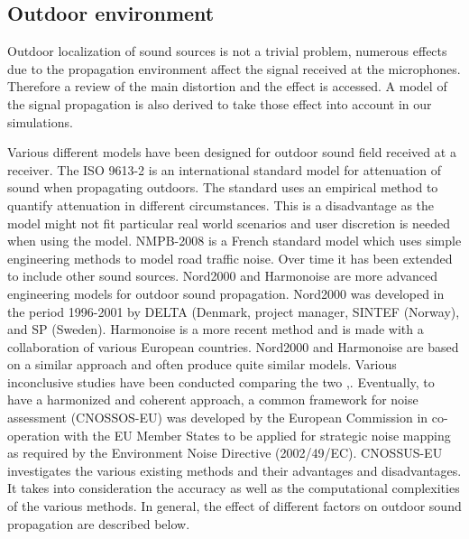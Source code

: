 \subsection{Outdoor environment}

Outdoor localization of sound sources is not a trivial problem, numerous effects due to the propagation environment affect the signal received at the microphones. Therefore a review of the main distortion and the effect is accessed. A model of the signal propagation is also derived to take those effect into account in our simulations. 

Various different models have been designed for outdoor sound field received at a receiver. The ISO 9613-2 \cite{ISO9613} is an international standard model for attenuation of sound when propagating outdoors. The standard uses an empirical method to quantify attenuation in different circumstances. This is a disadvantage as the model might not fit particular real world scenarios and user discretion is needed when using the model. NMPB-2008 \cite{dutilleux2010nmpb} is a French standard model which uses simple engineering methods to model road traffic noise. Over time it has been extended to include other sound sources. Nord2000 \cite{plovsing2000nord2000} and Harmonoise \cite{defrance2007outdoor} are more advanced engineering models for outdoor sound propagation. Nord2000 was developed in the period 1996-2001 by DELTA (Denmark, project manager, SINTEF (Norway), and SP (Sweden). Harmonoise is a more recent method and is made with a collaboration of various European countries. Nord2000 and Harmonoise are based on a similar approach and often produce quite similar models. Various inconclusive studies have been conducted comparing the two \cite{garg2014critical},\cite{jonsson2008comparison}. Eventually, to have a harmonized and coherent approach, a common framework for noise assessment (CNOSSOS-EU) was developed by the European Commission \cite{kephalopoulos2012common} in co-operation with the EU Member States to be applied for strategic noise mapping as required by the Environment Noise Directive (2002/49/EC). CNOSSUS-EU investigates the various existing methods and their advantages and disadvantages. It takes into consideration the accuracy as well as the computational complexities of the various methods. In general, the effect of different factors on outdoor sound propagation are described below.

